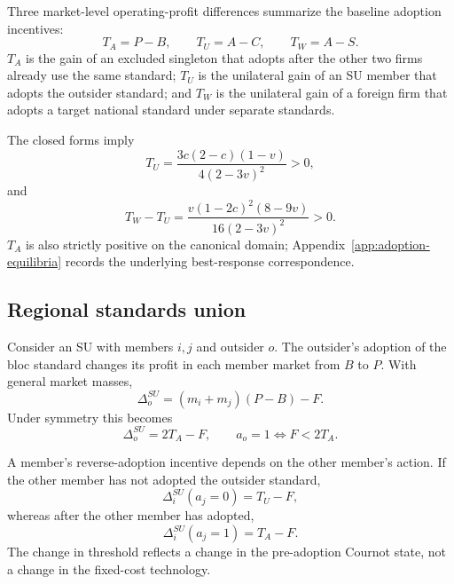 Three market-level operating-profit differences summarize the baseline adoption incentives:
\begin{equation}
    T_A=P-B,
    \qquad
    T_U=A-C,
    \qquad
    T_W=A-S.
    \label{eq:private-threshold-definitions}
\end{equation}
$T_A$ is the gain of an excluded singleton that adopts after the other two firms already use the same standard; $T_U$ is the unilateral gain of an SU member that adopts the outsider standard; and $T_W$ is the unilateral gain of a foreign firm that adopts a target national standard under separate standards.

The closed forms imply
\begin{equation}
    T_U
    =\frac{3c(2-c)(1-v)}{4(2-3v)^2}>0,
    \label{eq:TU-closed-form}
\end{equation}
and
\begin{equation}
    T_W-T_U
    =\frac{v(1-2c)^2(8-9v)}
           {16(2-3v)^2}>0.
    \label{eq:TW-minus-TU}
\end{equation}
$T_A$ is also strictly positive on the canonical domain; Appendix~\ref{app:adoption-equilibria} records the underlying best-response correspondence.

\subsection{Regional standards union}
\label{subsec:private-su}

Consider an SU with members $i,j$ and outsider $o$. The outsider's adoption of the bloc standard changes its profit in each member market from $B$ to $P$. With general market masses,
\begin{equation}
    \Delta_o^{SU}
    =(m_i+m_j)(P-B)-F.
    \label{eq:su-outsider-adoption-gain}
\end{equation}
Under symmetry this becomes
\begin{equation}
    \Delta_o^{SU}=2T_A-F,
    \qquad
    a_o=1\iff F<2T_A.
    \label{eq:su-outsider-main-threshold}
\end{equation}

A member's reverse-adoption incentive depends on the other member's action. If the other member has not adopted the outsider standard,
\begin{equation}
    \Delta_i^{SU}(a_j=0)
    =T_U-F,
    \label{eq:su-member-unilateral-gain}
\end{equation}
whereas after the other member has adopted,
\begin{equation}
    \Delta_i^{SU}(a_j=1)
    =T_A-F.
    \label{eq:su-member-post-rival-gain}
\end{equation}
The change in threshold reflects a change in the pre-adoption Cournot state, not a change in the fixed-cost technology.

